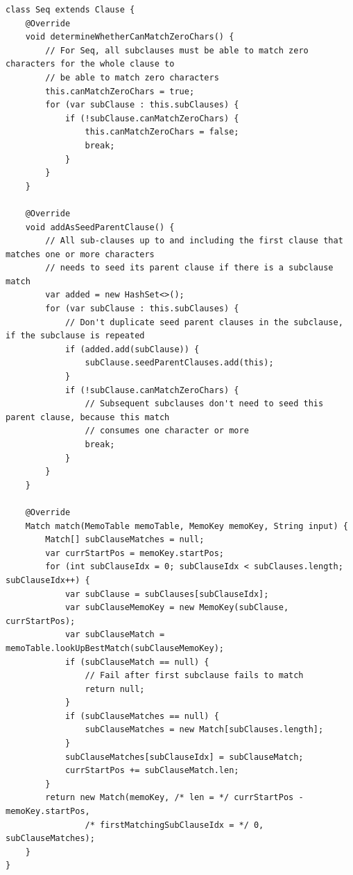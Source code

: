\documentclass[manuscript,screen]{acmart}
\begin{document}
\begin{lstlisting}[caption={The implementation of the \texttt{Seq} PEG operator},label={lst:Seq}]
class Seq extends Clause {
    @Override
    void determineWhetherCanMatchZeroChars() {
        // For Seq, all subclauses must be able to match zero characters for the whole clause to
        // be able to match zero characters
        this.canMatchZeroChars = true;
        for (var subClause : this.subClauses) {
            if (!subClause.canMatchZeroChars) {
                this.canMatchZeroChars = false;
                break;
            }
        }
    }
    
    @Override
    void addAsSeedParentClause() {
        // All sub-clauses up to and including the first clause that matches one or more characters
        // needs to seed its parent clause if there is a subclause match
        var added = new HashSet<>();
        for (var subClause : this.subClauses) {
            // Don't duplicate seed parent clauses in the subclause, if the subclause is repeated
            if (added.add(subClause)) {
                subClause.seedParentClauses.add(this);
            }
            if (!subClause.canMatchZeroChars) {
                // Subsequent subclauses don't need to seed this parent clause, because this match
                // consumes one character or more
                break;
            }
        }
    }

    @Override
    Match match(MemoTable memoTable, MemoKey memoKey, String input) {
        Match[] subClauseMatches = null;
        var currStartPos = memoKey.startPos;
        for (int subClauseIdx = 0; subClauseIdx < subClauses.length; subClauseIdx++) {
            var subClause = subClauses[subClauseIdx];
            var subClauseMemoKey = new MemoKey(subClause, currStartPos);
            var subClauseMatch = memoTable.lookUpBestMatch(subClauseMemoKey);
            if (subClauseMatch == null) {
                // Fail after first subclause fails to match
                return null;
            }
            if (subClauseMatches == null) {
                subClauseMatches = new Match[subClauses.length];
            }
            subClauseMatches[subClauseIdx] = subClauseMatch;
            currStartPos += subClauseMatch.len;
        }
        return new Match(memoKey, /* len = */ currStartPos - memoKey.startPos,
                /* firstMatchingSubClauseIdx = */ 0, subClauseMatches);
    }
}
\end{lstlisting}

\newpage
\end{document}
